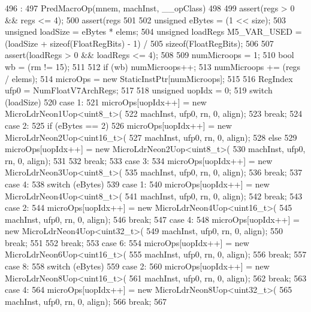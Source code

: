 \begin{DoxyCode}
496                                                      :
497     PredMacroOp(mnem, machInst, __opClass)
498 {
499     assert(regs > 0 && regs <= 4);
500     assert(regs %
501 
502     unsigned eBytes = (1 << size);
503     unsigned loadSize = eBytes * elems;
504     unsigned loadRegs M5_VAR_USED = (loadSize + sizeof(FloatRegBits) - 1) /
505                         sizeof(FloatRegBits);
506 
507     assert(loadRegs > 0 && loadRegs <= 4);
508 
509     numMicroops = 1;
510     bool wb = (rm != 15);
511 
512     if (wb) numMicroops++;
513     numMicroops += (regs / elems);
514     microOps = new StaticInstPtr[numMicroops];
515 
516     RegIndex ufp0 = NumFloatV7ArchRegs;
517 
518     unsigned uopIdx = 0;
519     switch (loadSize) {
520       case 1:
521         microOps[uopIdx++] = new MicroLdrNeon1Uop<uint8_t>(
522                 machInst, ufp0, rn, 0, align);
523         break;
524       case 2:
525         if (eBytes == 2) {
526             microOps[uopIdx++] = new MicroLdrNeon2Uop<uint16_t>(
527                     machInst, ufp0, rn, 0, align);
528         } else {
529             microOps[uopIdx++] = new MicroLdrNeon2Uop<uint8_t>(
530                     machInst, ufp0, rn, 0, align);
531         }
532         break;
533       case 3:
534         microOps[uopIdx++] = new MicroLdrNeon3Uop<uint8_t>(
535                 machInst, ufp0, rn, 0, align);
536         break;
537       case 4:
538         switch (eBytes) {
539           case 1:
540             microOps[uopIdx++] = new MicroLdrNeon4Uop<uint8_t>(
541                     machInst, ufp0, rn, 0, align);
542             break;
543           case 2:
544             microOps[uopIdx++] = new MicroLdrNeon4Uop<uint16_t>(
545                     machInst, ufp0, rn, 0, align);
546             break;
547           case 4:
548             microOps[uopIdx++] = new MicroLdrNeon4Uop<uint32_t>(
549                     machInst, ufp0, rn, 0, align);
550             break;
551         }
552         break;
553       case 6:
554         microOps[uopIdx++] = new MicroLdrNeon6Uop<uint16_t>(
555                 machInst, ufp0, rn, 0, align);
556         break;
557       case 8:
558         switch (eBytes) {
559           case 2:
560             microOps[uopIdx++] = new MicroLdrNeon8Uop<uint16_t>(
561                     machInst, ufp0, rn, 0, align);
562             break;
563           case 4:
564             microOps[uopIdx++] = new MicroLdrNeon8Uop<uint32_t>(
565                     machInst, ufp0, rn, 0, align);
566             break;
567         }
}}
\end{DoxyCode}

